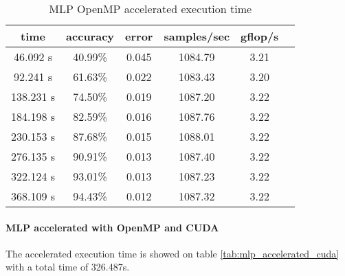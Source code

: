 \documentclass[11pt]{article}
\begin{document}
\begin{table}[h]	\centering
	\begin{tabular}{|c|c|c|c|c|c|}
		\hline
		\textbf{time} & \textbf{accuracy} & \textbf{error} & \textbf{samples/sec} & \textbf{gflop/s} \\ \hline
		46.092 s      & 40.99\%           & 0.045          & 1084.79              & 3.21             \\ \hline
		92.241 s      & 61.63\%           & 0.022          & 1083.43              & 3.20             \\ \hline
		138.231 s     & 74.50\%           & 0.019          & 1087.20              & 3.22             \\ \hline
		184.198 s     & 82.59\%           & 0.016          & 1087.76              & 3.22             \\ \hline
		230.153 s     & 87.68\%           & 0.015          & 1088.01              & 3.22             \\ \hline
		276.135 s     & 90.91\%           & 0.013          & 1087.40              & 3.22             \\ \hline
		322.124 s     & 93.01\%           & 0.013          & 1087.23              & 3.22             \\ \hline
		368.109 s     & 94.43\%           & 0.012          & 1087.32              & 3.22             \\ \hline
	\end{tabular}
	\caption{MLP OpenMP accelerated execution time}
	\label{tab:mlp_accelerated}
\end{table}

\paragraph*{MLP accelerated with OpenMP and CUDA} The accelerated execution time is showed on table \ref{tab:mlp_accelerated_cuda} with a total time of 326.487s.
\end{document}
